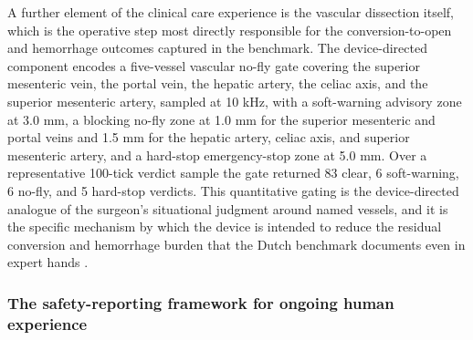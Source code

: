 A further element of the clinical care experience is the vascular dissection
itself, which is the operative step most directly responsible for the
conversion-to-open and hemorrhage outcomes captured in the benchmark. The
device-directed component encodes a five-vessel vascular no-fly gate covering the
superior mesenteric vein, the portal vein, the hepatic artery, the celiac axis,
and the superior mesenteric artery, sampled at 10 kHz, with a soft-warning advisory
zone at 3.0 mm, a blocking no-fly zone at 1.0 mm for the superior mesenteric and
portal veins and 1.5 mm for the hepatic artery, celiac axis, and superior
mesenteric artery, and a hard-stop emergency-stop zone at 5.0 mm. Over a
representative 100-tick verdict sample the gate returned 83 clear, 6 soft-warning,
6 no-fly, and 5 hard-stop verdicts. This quantitative gating is the device-directed
analogue of the surgeon's situational judgment around named vessels, and it is the
specific mechanism by which the device is intended to reduce the residual
conversion and hemorrhage burden that the Dutch benchmark documents even in
expert hands \cite{daraxwhipple, onpremwhippl}.

\subsubsection*{The safety-reporting framework for ongoing human experience}


